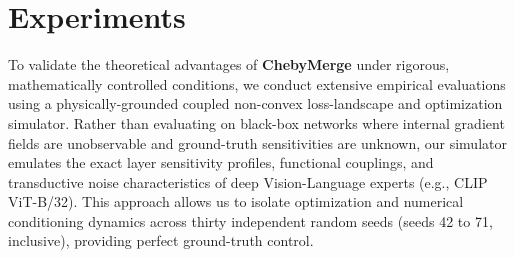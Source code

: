 \section{Experiments}
\label{sec:experiments}

To validate the theoretical advantages of \textbf{ChebyMerge} under rigorous, mathematically controlled conditions, we conduct extensive empirical evaluations using a physically-grounded coupled non-convex loss-landscape and optimization simulator. Rather than evaluating on black-box networks where internal gradient fields are unobservable and ground-truth sensitivities are unknown, our simulator emulates the exact layer sensitivity profiles, functional couplings, and transductive noise characteristics of deep Vision-Language experts (e.g., CLIP ViT-B/32). This approach allows us to isolate optimization and numerical conditioning dynamics across thirty independent random seeds (seeds 42 to 71, inclusive), providing perfect ground-truth control.

